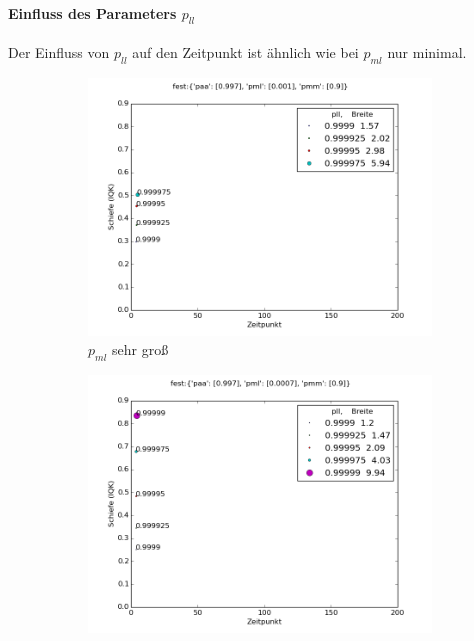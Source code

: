 
\paragraph*{Einfluss des Parameters $p_{ll}$}

Der Einfluss von $p_{ll}$ auf den Zeitpunkt ist ähnlich wie bei $p_{ml}$ nur minimal.

\begin{figure}
\begin{subfigure}[t]{0.49\textwidth}
\includegraphics[width=\textwidth]{bilder/pll/3fest_09_0001_0997_p}
\caption{$p_{ml}$ sehr groß}
\label{einfluss_pll_pml++}
\end{subfigure}
\begin{subfigure}[t]{0.49\textwidth}
\includegraphics[width=\textwidth]{bilder/pll/3fest_09_00007_0997_p}

\end{subfigure}
\end{figure}
